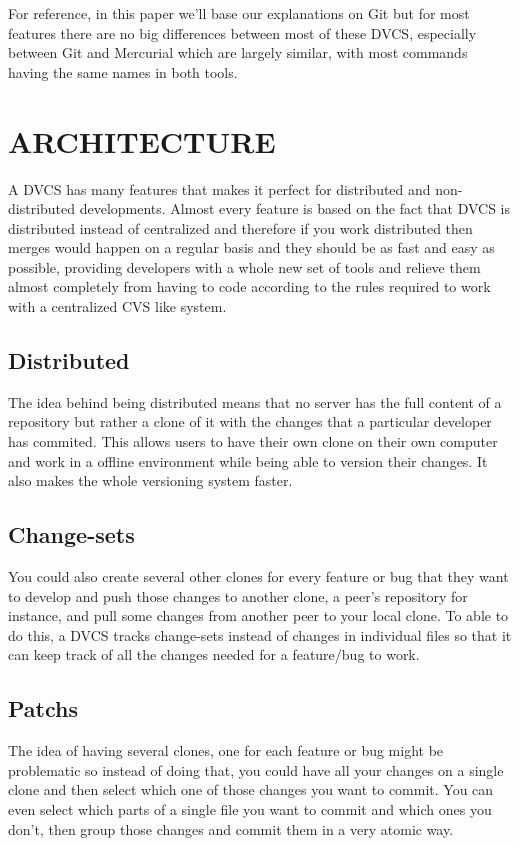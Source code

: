 For reference, in this paper we'll base our explanations on Git but for most features there 
are no big differences between most of these DVCS, especially between Git and Mercurial which are 
largely similar, with most commands having the same names in both tools.


\section{ARCHITECTURE}

A DVCS has many features that makes it perfect for distributed and non-distributed developments. Almost every feature is based on the fact that DVCS is distributed instead of centralized and therefore if you work distributed then merges would happen on a regular basis and they should be as fast and easy as possible, providing developers with a whole new set of tools and relieve them almost completely from having to code according to the rules required to work with a centralized CVS like system. 

\subsection{Distributed}
The idea behind being distributed means that no server has the full content of a repository but rather a clone of it with the changes that a particular developer has commited. This allows users to have their own clone on their own computer and work in a offline environment while being able to version their changes. It also makes the whole versioning system faster.

\subsection{Change-sets}
You could also create several other clones for every feature or bug that they want to develop and push those changes to another clone, a peer's repository for instance, and pull some changes from another peer to your local clone. To able to do this, a DVCS tracks change-sets instead of changes in individual files so that it can keep track of all the changes needed for a feature/bug to work. 

\subsection{Patchs}
The idea of having several clones, one for each feature or bug might be problematic so instead of doing that, you could have all your changes on a single clone and then select which one of those changes you want to commit. You can even select which parts of a single file you want to commit and which ones you don't, then group those changes and commit them in a very atomic way.

